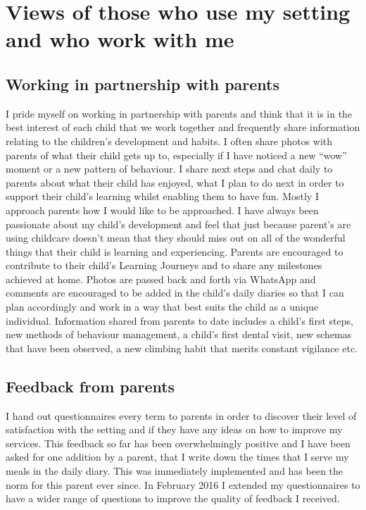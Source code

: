 \documentclass[10pt,a4paper]{report}
\begin{document}
\chapter{Views of those who use my setting and who work with me}

\section{Working in partnership with parents}

I pride myself on working in partnership with parents and think that it is in the best interest of each child that we work together and frequently share information relating to the children's development and habits. I often share photos with parents of what their child gets up to, especially if I have noticed a new “wow” moment or a new pattern of behaviour. I share next steps and chat daily to parents about what their child has enjoyed, what I plan to do next in order to support their child's learning whilst enabling them to have fun. Mostly I approach parents how I would like to be approached. I have always been passionate about my child's development and feel that just because parent's are using childcare doesn't mean that they should miss out on all of the wonderful things that their child is learning and experiencing. Parents are encouraged to contribute to their child's Learning Journeys and to share any milestones achieved at home. Photos are passed back and forth via WhatsApp and comments are encouraged to be added in the child's daily diaries so that I can plan accordingly and work in a way that best suits the child as a unique individual. Information shared from parents to date includes a child's first steps, new methods of behaviour management, a child's first dental visit, new schemas that have been observed, a new climbing habit that merits constant vigilance etc.

\section{Feedback from parents}

I hand out questionnaires every term to parents in order to discover their level of satisfaction with the setting and if they have any ideas on how to improve my services. This feedback so far has been overwhelmingly positive and I have been asked for one addition by a parent, that I write down the times that I serve my meals in the daily diary. This was immediately implemented and has been the norm for this parent ever since. In February 2016 I extended my questionnaires to have a wider range of questions to improve the quality of feedback I received. 
\end{document}

